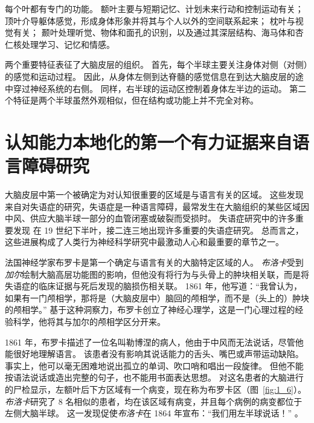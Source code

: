 每个叶都有专门的功能。
额叶主要与短期记忆、计划未来行动和控制运动有关；
顶叶介导躯体感觉，形成身体形象并将其与个人以外的空间联系起来；
枕叶与视觉有关；
颞叶处理听觉、物体和面孔的识别，以及通过其深层结构、海马体和杏仁核处理学习、记忆和情感。


两个重要特征表征了大脑皮层的组织。
首先，每个半球主要关注身体对侧（对侧）的感觉和运动过程。
因此，从身体左侧到达脊髓的感觉信息在到达大脑皮层的途中穿过神经系统的右侧。
同样，右半球的运动区控制着身体左半边的运动。
第二个特征是两个半球虽然外观相似，但在结构或功能上并不完全对称。



\section{认知能力本地化的第一个有力证据来自语言障碍研究}

大脑皮层中第一个被确定为对认知很重要的区域是与语言有关的区域。
这些发现来自对失语症的研究，失语症是一种语言障碍，最常发生在大脑组织的某些区域因中风、供应大脑半球一部分的血管闭塞或破裂而受损时。
失语症研究中的许多重要发现
在 19 世纪下半叶，接二连三地出现许多重要的失语症研究。
总而言之，这些进展构成了人类行为神经科学研究中最激动人心和最重要的章节之一。


法国神经学家布罗卡是第一个确定与语言有关的大脑特定区域的人。
\textit{布洛卡}受到\textit{加尔}绘制大脑高层功能图的影响，但他没有将行为与头骨上的肿块相关联，而是将失语症的临床证据与死后发现的脑损伤相关联。
1861 年，他写道：“我曾认为，如果有一门颅相学，那将是（大脑皮层中）脑回的颅相学，而不是（头上的）肿块的颅相学。” 
基于这种洞察力，布罗卡创立了神经心理学，这是一门心理过程的经验科学，他将其与加尔的颅相学区分开来。


1861 年，布罗卡描述了一位名叫勒博涅的病人，他由于中风而无法说话，尽管他能很好地理解语言。
该患者没有影响其说话能力的舌头、嘴巴或声带运动缺陷。
事实上，他可以毫无困难地说出孤立的单词、吹口哨和唱出一段旋律。
但他不能按语法说话或造出完整的句子，也不能用书面表达思想。
对这名患者的大脑进行的尸检显示，左额叶后下方区域有一个病变，现在称为布罗卡区（图~\ref{fig:1_6}）。
\textit{布洛卡}研究了 8 名相似的患者，均在该区域有病变，并且每个病例的病变都位于左侧大脑半球。
这一发现促使\textit{布洛卡}在 1864 年宣布：“我们用左半球说话！” 。


